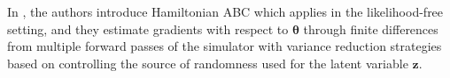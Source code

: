 \documentclass[twocolumn,superscriptaddress,aps]{revtex4-1}
\newcommand{\kcnote}[1]{\textcolor{red}{[KC: #1]}}
\newcommand{\bftheta}{{\bm \theta}}
\newcommand{\bfx}{\mathbf{x}}
\newcommand{\bfz}{\mathbf{z}}
\theoremstyle{plain}
\begin{document}

In \citep{meeds2015hamiltonian}, the authors introduce Hamiltonian ABC which
applies in the likelihood-free setting, and they estimate gradients with respect
to $\bftheta$ through finite differences from multiple forward passes of the
simulator with variance reduction strategies based on controlling the source of
randomness used for the latent variable $\bfz$.


\end{document}
